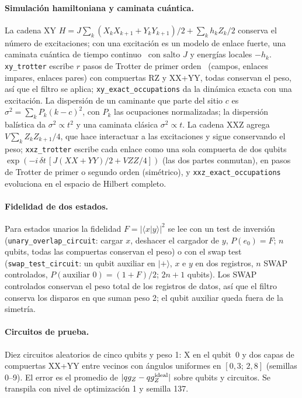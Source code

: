 \documentclass[11pt]{article}
\newcommand{\qZ}{qg_Z}
\begin{document}
\paragraph{Simulación hamiltoniana y caminata cuántica.} La cadena XY
$H=J\sum_k(X_kX_{k+1}+Y_kY_{k+1})/2+\sum_k h_kZ_k/2$ conserva el número de excitaciones; con una excitación es
un modelo de enlace fuerte, una caminata cuántica de tiempo continuo~\cite{kempe2003walks} con salto $J$ y
energías locales $-h_k$. \texttt{xy\_trotter} escribe $r$ pasos de Trotter de primer
orden~\cite{lloyd1996simulators} (campos, enlaces impares, enlaces pares) con compuertas RZ y XX+YY, todas
conservan el peso, así que el filtro se aplica; \texttt{xy\_exact\_occupations} da la dinámica exacta con una
excitación. La dispersión de un caminante que parte del sitio $c$ es $\sigma^2=\sum_kP_k(k-c)^2$, con $P_k$
las ocupaciones normalizadas; la dispersión balística da $\sigma^2\propto t^2$ y una caminata clásica
$\sigma^2\propto t$. La cadena XXZ agrega $V\sum_kZ_kZ_{k+1}/4$, que hace interactuar a las excitaciones y sigue
conservando el peso; \texttt{xxz\_trotter} escribe cada enlace como una sola compuerta de dos qubits
$\exp(-i\,\delta t\,[J(XX+YY)/2+VZZ/4])$ (las dos partes conmutan), en pasos de Trotter de primer o segundo
orden (simétrico), y \texttt{xxz\_exact\_occupations} evoluciona en el espacio de Hilbert completo.

\paragraph{Fidelidad de dos estados.} Para estados unarios la fidelidad $F=|\langle x|y\rangle|^2$ se lee con un
test de inversión (\texttt{unary\_overlap\_circuit}: cargar $x$, deshacer el cargador de $y$, $P(e_0)=F$; $n$
qubits, todas las compuertas conservan el peso) o con el swap test~\cite{buhrman2001fingerprinting}
(\texttt{swap\_test\_circuit}: un qubit auxiliar en $|+\rangle$, $x$ e $y$ en dos registros, $n$ SWAP controlados,
$P(\text{auxiliar }0)=(1+F)/2$; $2n+1$ qubits). Los SWAP controlados conservan el peso total de los registros de
datos, así que el filtro conserva los disparos en que suman peso 2; el qubit auxiliar queda fuera de la
simetría.

\paragraph{Circuitos de prueba.} Diez circuitos aleatorios de cinco qubits y peso 1: X en el qubit~0 y dos
capas de compuertas XX+YY entre vecinos con ángulos uniformes en $[0{,}3;\,2{,}8]$ (semillas 0--9). El error
es el promedio de $|\qZ-\qZ^{\rm ideal}|$ sobre qubits y circuitos. Se transpila con nivel de optimización 1
y semilla 137.
\end{document}
